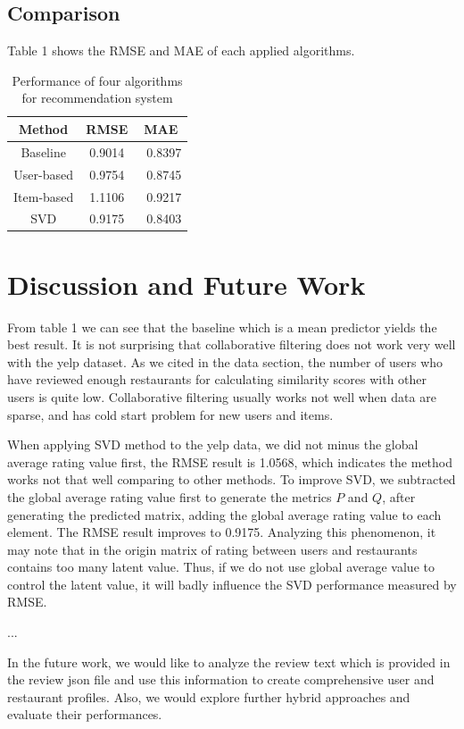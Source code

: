 \documentclass{llncs}
\begin{document}
\subsection{Comparison}
Table 1 shows the RMSE and MAE of each applied algorithms.
\begin{table}
	\caption{Performance of four algorithms for recommendation system}
	\begin{center}
		\begin{tabular}{ccc}
			\hline
				\rule{0pt}{12pt}Method  & \rule{0pt}{12pt}RMSE   &\rule{0pt}{12pt} MAE\\
			\hline\rule{0pt}{12pt}
			Baseline    &   0.9014 & \ 	0.8397 \\
			User-based  &   0.9754 & \ 	0.8745\\
			Item-based  &   1.1106 & \      0.9217\\
			SVD         &   0.9175 & \      0.8403\\
			\hline
		\end{tabular}
	\end{center}
\end{table}

\section{Discussion and Future Work}
From table 1 we can see that the baseline which is a mean predictor yields the best result. It is not surprising that collaborative filtering does not work very well with the yelp dataset. As we cited in the data section, the number of users who have reviewed enough restaurants for calculating similarity scores with other users is quite low. Collaborative filtering usually works not well when data are sparse, and has cold start problem for new users and items.

When applying SVD method to the yelp data, we did not minus the global average rating value first, the RMSE result is 1.0568, which indicates the method works not that well comparing to other methods. To improve SVD, we subtracted the global average rating value first to generate the metrics $P$ and $Q$, after generating the predicted matrix, adding the global average rating value to each element. The RMSE result improves to  0.9175. Analyzing this phenomenon, it may note that in the origin matrix of rating between users and restaurants contains too many latent value. Thus, if we do not use global average value to control the latent value, it will badly influence the SVD performance measured by RMSE.
 
 ...
 
 In the future work, we would like to analyze the review text which is provided in the review json file and use this information to create comprehensive user and restaurant profiles. Also, we would explore further hybrid approaches and evaluate their performances.
\end{document}
